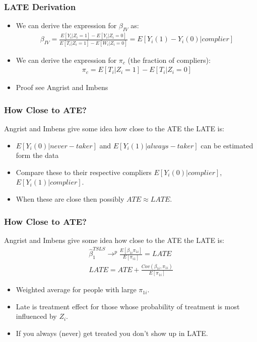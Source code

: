 \documentclass[xcolor=pdftex,dvipsnames,table,mathserif]{beamer}
\begin{document}
\begin{frame}
\frametitle{LATE Derivation}
\begin{itemize}
\item We can derive the expression for $\beta_{IV}$ as:
\begin{eqnarray*}
\beta_{IV} = \frac{E[Y_i  | Z_i = 1] - E[Y_i | Z_i = 0] }{E[T_i | Z_i=1 ] - E[W_i | Z_i = 0]} = E[Y_i(1) - Y_i(0) | complier]
\end{eqnarray*}
\item We can derive the expression for $\pi_c$ (the fraction of compliers):
\begin{eqnarray*}
\pi_c = E[T_i | Z_i = 1] - E[T_i | Z_i =0] 
\end{eqnarray*}
\item Proof see Angrist and Imbens
\end{itemize}
\end{frame}

\begin{frame}
\frametitle{How Close to ATE?}
Angrist and Imbens give some idea how close to the ATE the LATE is:
\begin{itemize}
\item $E[Y_i(0) | never-taker]$ and  $E[Y_i(1) | always-taker]$ can be estimated form the data
\item Compare these to their respective compliers $E[Y_i(0) | complier]$, $E[Y_i(1) | complier]$.
\item When these are close then possibly $ATE \approx LATE$.
\end{itemize}
\end{frame}

\begin{frame}
\frametitle{How Close to ATE?}
Angrist and Imbens give some idea how close to the ATE the LATE is:
\begin{eqnarray*}
\widehat{\beta}_1^{TSLS} \rightarrow^p \frac{E[\beta_{1i} \pi_{1i}]}{E[\pi_{i1}]} = LATE \\
LATE = ATE + \frac{Cov(\beta_{1i},\pi_{1i})}{E[\pi_{1i}]}
\end{eqnarray*}
\begin{itemize}
\item Weighted average for people with large $\pi_{1i}$.
\item Late is treatment effect for those whose probability of treatment is most influenced by $Z_i$.
\item If you always (never) get treated you don't show up in LATE.
\end{itemize}
\end{frame}
\end{document}
